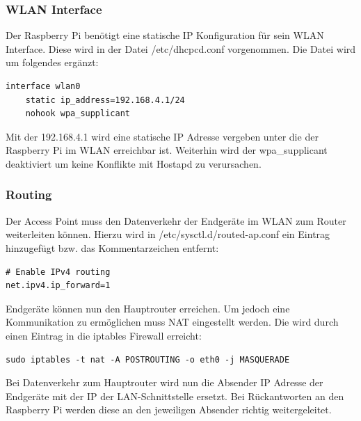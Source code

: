 \documentclass[a4paper,11pt,singlespacing]{article}
\begin{document}
            \subsubsection{WLAN Interface}
                Der Raspberry Pi benötigt eine statische IP Konfiguration für sein WLAN Interface. Diese wird in der Datei /etc/dhcpcd.conf vorgenommen. Die Datei wird um folgendes ergänzt:\\
                \lstset{
                language=bash,
                }
                \begin{lstlisting}
interface wlan0
    static ip_address=192.168.4.1/24
    nohook wpa_supplicant
                \end{lstlisting} 
                Mit der 192.168.4.1 wird eine statische IP Adresse vergeben unter die der Raspberry Pi im WLAN erreichbar ist. Weiterhin wird der wpa{\_}supplicant deaktiviert um keine Konflikte mit Hostapd zu verursachen. \cite{Quote_hostapd1} \cite{Quote_APKonfig}
            
            \subsubsection{Routing}
                Der Access Point muss den Datenverkehr der Endgeräte im WLAN zum Router weiterleiten können.
                Hierzu wird in /etc/sysctl.d/routed-ap.conf ein Eintrag hinzugefügt bzw. das Kommentarzeichen entfernt:\\
                \lstset{
                language=bash,
                }

                \begin{lstlisting}
# Enable IPv4 routing
net.ipv4.ip_forward=1
                \end{lstlisting}
                Endgeräte können nun den Hauptrouter erreichen. Um jedoch eine Kommunikation zu ermöglichen muss NAT eingestellt werden. Die wird durch einen Eintrag in die iptables Firewall erreicht: \\
            
                \begin{lstlisting}
sudo iptables -t nat -A POSTROUTING -o eth0 -j MASQUERADE
                \end{lstlisting} 
       
                Bei Datenverkehr zum Hauptrouter wird nun die Absender IP Adresse der Endgeräte mit der IP der LAN-Schnittstelle ersetzt. Bei Rückantworten an den Raspberry Pi werden diese an den jeweiligen Absender richtig weitergeleitet. \cite{Quote_hostapd1} \cite{Quote_APKonfig}\\
            
\end{document}
